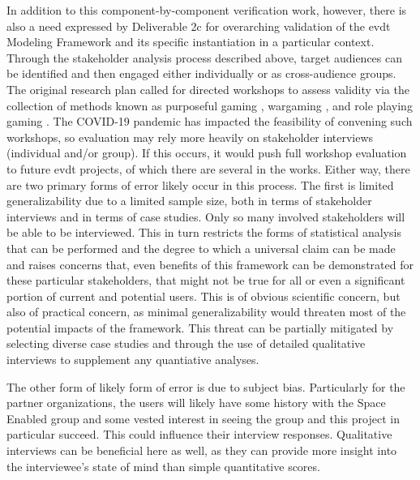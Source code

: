 \documentclass[notitlepage]{article}
\begin{document}
In addition to this component-by-component verification work, however, there is also a need expressed by Deliverable 2c for overarching validation of the \ac{evdt} Modeling Framework and its specific instantiation in a particular context. Through the stakeholder analysis process described above, target audiences can be identified and then engaged either individually or as cross-audience groups. The original research plan called for directed workshops to assess validity via the collection of methods known as purposeful gaming \cite{rossGamebasedLearningSystems2014}, wargaming \cite{hansonImprovingOperationalWargaming2016,selvaRevitalizingWargamingNecessary15,shlapakReinforcingDeterrenceNATO2016}, and role playing gaming \cite{groganStrategicEngineeringGaming2012,groganFederatedSimulationGaming2012}. The COVID-19 pandemic has impacted the feasibility of convening such workshops, so evaluation may rely more heavily on stakeholder interviews (individual and/or group). If this occurs, it would push full workshop evaluation to future \ac{evdt} projects, of which there are several in the works. Either way, there are two primary forms of error likely occur in this process. The first is limited generalizability due to a limited sample size, both in terms of stakeholder interviews and in terms of case studies. Only so many involved stakeholders will be able to be interviewed. This in turn restricts the forms of statistical analysis that can be performed and the degree to which a universal claim can be made and raises concerns that, even benefits of this framework can be demonstrated for these particular stakeholders, that might not be true for all or even a significant portion of current and potential users. This is of obvious scientific concern, but also of practical concern, as minimal generalizability would threaten most of the potential impacts of the framework. This threat can be partially mitigated by selecting diverse case studies and through the use of detailed qualitative interviews to supplement any quantiative analyses.

The other form of likely form of error is due to subject bias. Particularly for the partner organizations, the users will likely have some history with the Space Enabled group and some vested interest in seeing the group and this project in particular succeed. This could influence their interview responses. Qualitative interviews can be beneficial here as well, as they can provide more insight into the interviewee's state of mind than simple quantitative scores. 
\end{document}
